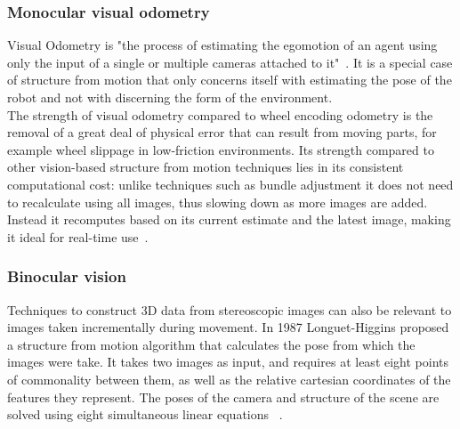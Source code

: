 \documentclass[a4paper, 12pt, titlepage]{article}
\begin{document}
		\subsubsection{Monocular visual odometry}
		Visual Odometry is "the process of estimating
the egomotion of an agent using only the input of a single or
multiple cameras attached to it"~\cite{scaramuzza2011visual}. It is a special case of structure from motion that only concerns itself with estimating the pose of the robot and not with discerning the form of the environment. 
		\\The strength of visual odometry compared to wheel encoding odometry is the removal of a great deal of physical error that can result from moving parts, for example wheel slippage in low-friction environments. Its strength compared to other vision-based structure from motion techniques lies in its consistent computational cost: unlike techniques such as bundle adjustment it does not need to recalculate using all images, thus slowing down as more images are added. Instead it recomputes based on its current estimate and the latest image, making it ideal for real-time use~\cite{scaramuzza2011visual}.
		
		\subsubsection{Binocular vision}
		Techniques to construct 3D data from stereoscopic images can also be relevant to images taken incrementally during movement. In 1987 Longuet-Higgins proposed a structure from motion algorithm that calculates the pose from which the images were take. It takes two images as input, and requires at least eight points of commonality between them, as well as the relative cartesian coordinates of the features they represent. The poses of the camera and structure of the scene are solved using eight simultaneous linear equations ~\cite{longuet1987computer}.
		
		

\renewcommand{\refname}{References}


\end{document}
